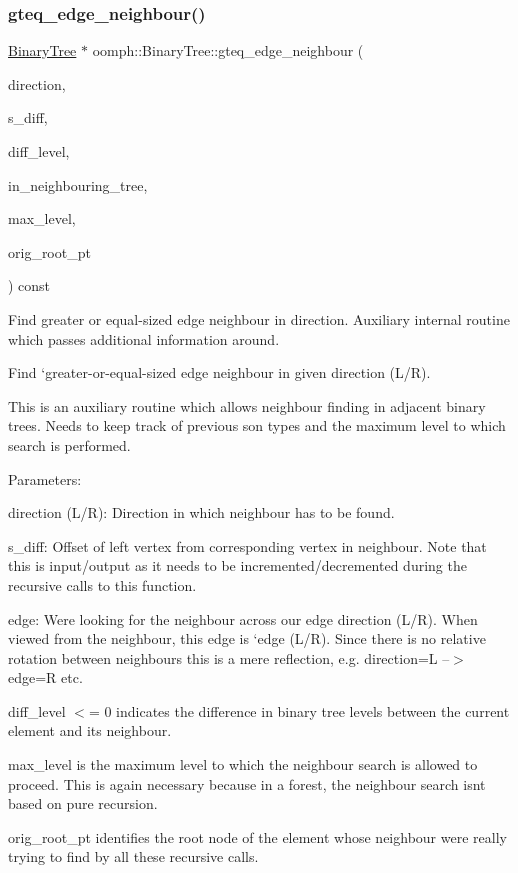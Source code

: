 \subsubsection{\texorpdfstring{gteq\+\_\+edge\+\_\+neighbour()}{gteq\_edge\_neighbour()}\hspace{0.1cm}{\footnotesize\ttfamily [2/2]}}
{\footnotesize\ttfamily \hyperlink{classoomph_1_1BinaryTree}{Binary\+Tree} $\ast$ oomph\+::\+Binary\+Tree\+::gteq\+\_\+edge\+\_\+neighbour (\begin{DoxyParamCaption}\item[{const int \&}]{direction,  }\item[{double \&}]{s\+\_\+diff,  }\item[{int \&}]{diff\+\_\+level,  }\item[{bool \&}]{in\+\_\+neighbouring\+\_\+tree,  }\item[{int}]{max\+\_\+level,  }\item[{\hyperlink{classoomph_1_1BinaryTreeRoot}{Binary\+Tree\+Root} $\ast$const \&}]{orig\+\_\+root\+\_\+pt }\end{DoxyParamCaption}) const\hspace{0.3cm}{\ttfamily [private]}}



Find greater or equal-\/sized edge neighbour in direction. Auxiliary internal routine which passes additional information around. 

Find `greater-\/or-\/equal-\/sized edge neighbour\textquotesingle{} in given direction (L/R).

This is an auxiliary routine which allows neighbour finding in adjacent binary trees. Needs to keep track of previous son types and the maximum level to which search is performed.

Parameters\+:
\begin{DoxyItemize}
\item direction (L/R)\+: Direction in which neighbour has to be found.
\item s\+\_\+diff\+: Offset of left vertex from corresponding vertex in neighbour. Note that this is input/output as it needs to be incremented/decremented during the recursive calls to this function.
\item edge\+: We\textquotesingle{}re looking for the neighbour across our edge \textquotesingle{}direction\textquotesingle{} (L/R). When viewed from the neighbour, this edge is `edge\textquotesingle{} (L/R). Since there is no relative rotation between neighbours this is a mere reflection, e.\+g. direction=L --$>$ edge=R etc.
\item diff\+\_\+level $<$= 0 indicates the difference in binary tree levels between the current element and its neighbour.
\item max\+\_\+level is the maximum level to which the neighbour search is allowed to proceed. This is again necessary because in a forest, the neighbour search isn\textquotesingle{}t based on pure recursion.
\item orig\+\_\+root\+\_\+pt identifies the root node of the element whose neighbour we\textquotesingle{}re really trying to find by all these recursive calls. 
\end{DoxyItemize}

